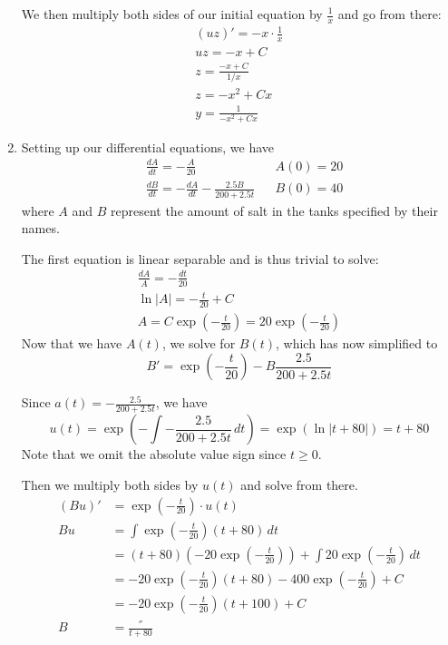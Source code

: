 \documentclass[12pt]{article}
\begin{document}
\begin{enumerate}
          We then multiply both sides of our initial equation by $\frac{1}{x}$ and go from there:
          \begin{gather*}
              (uz)'=-x \cdot \frac{1}{x} \\
              uz=-x+C \\
              z=\frac{-x+C}{1/x} \\
              z=-x^2+Cx \\
              \boxed{y=\frac{1}{-x^2+Cx}}
          \end{gather*}
    \item Setting up our differential equations, we have
          \begin{align*}
               & \frac{dA}{dt}=-\frac{A}{20}                        &  & A(0)=20 \\
               & \frac{dB}{dt}=-\frac{dA}{dt}-\frac{2.5B}{200+2.5t} &  & B(0)=40
          \end{align*}
          where $A$ and $B$ represent the amount of salt in the tanks specified by their names.

          The first equation is linear separable and is thus trivial to solve:
          \begin{gather*}
              \frac{dA}{A}=-\frac{dt}{20} \\
              \ln |A|=-\frac{t}{20}+C \\
              A=C\exp(-\frac{t}{20})=20\exp\left(-\frac{t}{20}\right)
          \end{gather*}
          Now that we have $A(t)$, we solve for $B(t)$, which has now simplified to
          \[B'=\exp\left(-\frac{t}{20}\right)-B\frac{2.5}{200+2.5t}\]

          Since $a(t)=-\frac{2.5}{200+2.5t}$, we have
          \[u(t)=\exp\left(-\int -\frac{2.5}{200+2.5t}\,dt\right)=\exp(\ln |t+80|)=t+80\]
          Note that we omit the absolute value sign since $t \ge 0$.

          Then we multiply both sides by $u(t)$ and solve from there.
          \begin{align*}
              (Bu)' & =\exp\left(-\frac{t}{20}\right) \cdot u(t)                                           \\
              Bu    & =\int \exp\left(-\frac{t}{20}\right)(t+80)\,dt                                       \\
                    & =(t+80)(-20\exp\left(-\frac{t}{20}\right))+\int 20\exp\left(-\frac{t}{20}\right)\,dt \\
                    & =-20\exp\left(-\frac{t}{20}\right)(t+80)-400\exp\left(-\frac{t}{20}\right)+C         \\
                    & =-20\exp\left(-\frac{t}{20}\right)(t+100)+C                                          \\
              B     & =\frac{''}{t+80}
          \end{align*}


\end{enumerate}
\end{document}
